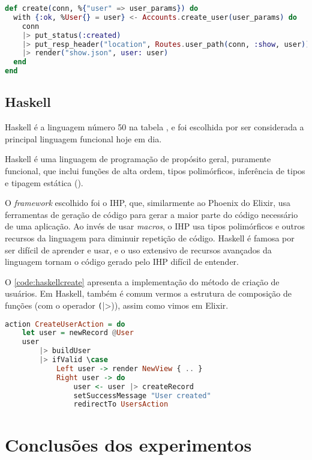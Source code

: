 \begin{lstlisting}[language=Elixir,label={code:elixircreate},caption={Função de criação de usuário em Elixir com Phoenix}]
def create(conn, %{"user" => user_params}) do
  with {:ok, %User{} = user} <- Accounts.create_user(user_params) do
    conn
    |> put_status(:created)
    |> put_resp_header("location", Routes.user_path(conn, :show, user))
    |> render("show.json", user: user)
  end
end
\end{lstlisting}

\subsection{Haskell}

Haskell é a linguagem número 50 na tabela \textcite{tiobeindex}, e foi escolhida
por ser considerada a principal linguagem funcional hoje em dia.

Haskell é uma linguagem de programação de propósito geral, puramente funcional,
que inclui funções de alta ordem, tipos polimórficos, inferência de tipos e
tipagem estática (\textcite{conceptionoffunctionalpl}).

O \textit{framework} escolhido foi o IHP, que, similarmente ao Phoenix do Elixir,
usa ferramentas de geração de código para gerar a maior parte do código necessário
de uma aplicação. Ao invés de usar \textit{macros}, o IHP usa tipos polimórficos
e outros recursos da linguagem para diminuir repetição de código. Haskell é
famosa por ser difícil de aprender e usar, e o uso extensivo de recursos avançados
da linguagem tornam o código gerado pelo IHP difícil de entender.

O \autoref{code:haskellcreate} apresenta a implementação do método de criação de
usuários. Em Haskell, também é comum vermos a estrutura de composição de funções
(com o operador \texttt(|>)), assim como vimos em Elixir.

\begin{lstlisting}[language=Haskell,label={code:haskellcreate},caption={Função de criação de usuário em Haskell com IHP}]
action CreateUserAction = do
    let user = newRecord @User
    user
        |> buildUser
        |> ifValid \case
            Left user -> render NewView { .. } 
            Right user -> do
                user <- user |> createRecord
                setSuccessMessage "User created"
                redirectTo UsersAction
\end{lstlisting}

\section{Conclusões dos experimentos}

